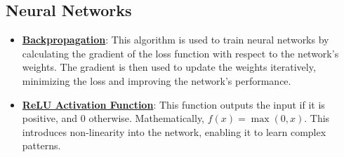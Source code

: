 \documentclass{article}%
\begin{document}
\subsection{Neural Networks}%
\label{subsec:NeuralNetworks}%
\begin{itemize}[leftmargin=*]%
\item \href{https://purdue.brightspace.com/d2l/common/assets/pdfjs-d2l-dist/1.0.14-legacy/web/viewer.html?file=\%2Fcontent\%2Fenforced\%2F1095467-wl.202510.CS.24300.001\%2F09L1-cnn.pdf\%3Fou\%3D1095467\&lang=en-us\&container=d2l-fileviewer-rendered-pdf\&fullscreen=d2l-fileviewer-rendered-pdf-dialog\&height=667#page=16}{\textbf{Backpropagation}}: This algorithm is used to train neural networks by calculating the gradient of the loss function with respect to the network's weights. The gradient is then used to update the weights iteratively, minimizing the loss and improving the network's performance.%
\item \href{https://purdue.brightspace.com/d2l/common/assets/pdfjs-d2l-dist/1.0.14-legacy/web/viewer.html?file=\%2Fcontent\%2Fenforced\%2F1095467-wl.202510.CS.24300.001\%2F09L1-cnn.pdf\%3Fou\%3D1095467\&lang=en-us\&container=d2l-fileviewer-rendered-pdf\&fullscreen=d2l-fileviewer-rendered-pdf-dialog\&height=667#page=13}{\textbf{ReLU Activation Function}}: This function outputs the input if it is positive, and 0 otherwise. Mathematically, $f(x) = \max(0, x)$. This introduces non-linearity into the network, enabling it to learn complex patterns.%
\end{itemize}

%
\end{document}

